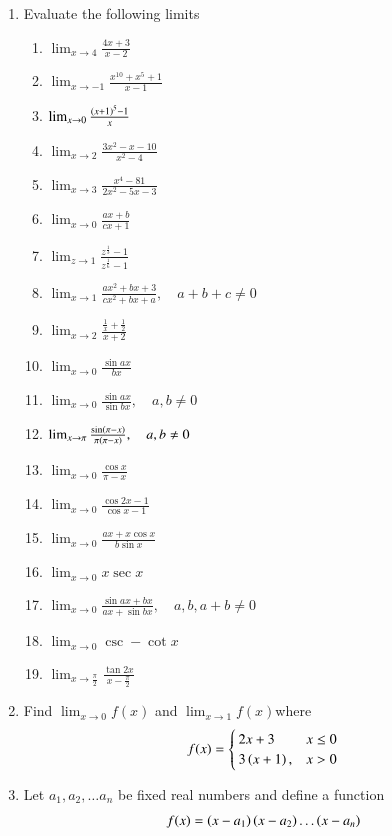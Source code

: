 \begin{enumerate}[label=\arabic*.,ref=\thesubsection.\theenumi]
\item Evaluate the following limits
%
\begin{enumerate}
\item  $\lim_{x\to 4} \frac{4x+3}{x-2}$
\item  $\lim_{x\to -1} \frac{x^10+x^5+1}{x-1}$
\item  $\lim_{x\to 0} \frac{\left(x+1\right)^5-1}{x}$
\item  $\lim_{x\to 2} \frac{3x^2-x-10}{x^2-4}$
\item  $\lim_{x\to 3} \frac{x^4-81}{2x^2-5x-3}$
\item  $\lim_{x\to 0} \frac{ax+b}{cx+1}$
\item  $\lim_{z\to 1} \frac{z^{\frac{1}{3}}-1}{z^{\frac{1}{6}}-1}$
\item  $\lim_{x\to 1} \frac{ax^2+bx+3}{cx^2+bx+a}, \quad a+b+c \ne 0$
\item  $\lim_{x\to 2} \frac{\frac{1}{x}+\frac{1}{2}}{x+2}$
\item  $\lim_{x\to 0} \frac{\sin ax}{bx}$
\item  $\lim_{x\to 0} \frac{\sin ax}{\sin bx}, \quad a,b \ne 0$
\item  $\lim_{x\to \pi} \frac{\sin \left(\pi-x\right)}{\pi \left(\pi-x\right)}, \quad a,b \ne 0$
\item  $\lim_{x\to 0} \frac{\cos x}{\pi -x}$
\item  $\lim_{x\to 0} \frac{\cos 2x-1}{\cos x-1}$
\item  $\lim_{x\to 0} \frac{ax + x\cos x}{b\sin x}$
\item  $\lim_{x\to 0} x\sec x$
\item  $\lim_{x\to 0} \frac{\sin ax + bx}{ax+\sin bx}, \quad a,b, a+b \ne 0$
\item  $\lim_{x\to 0} \csc - \cot x$
\item  $\lim_{x\to \frac{\pi}{2}} \frac{\tan 2x}{x-\frac{\pi}{2}}$
\end{enumerate}
%
\item Find $\lim_{x\to 0} f(x)$ and $\lim_{x\to 1} f(x)$where
\begin{align}
f(x) = 
\begin{cases}
2x+3 & x \le 0
\\
3\left(x+1\right), & x > 0
\end{cases}
\end{align}
%
\item Let $a_1, a_2, \dots a_n$ be fixed real numbers and define a function
\begin{align}
f(x) = \left(x-a_1\right)\left(x-a_2\right)\dots \left(x-a_n\right)
\end{align}

\end{enumerate}
